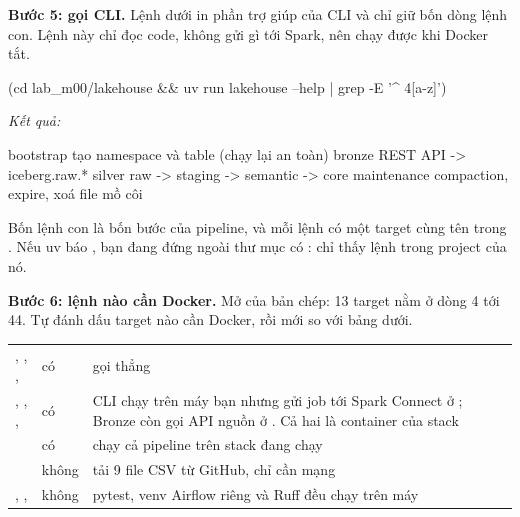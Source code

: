 \textbf{Bước 5: gọi CLI.} Lệnh dưới in phần trợ giúp của CLI  và chỉ giữ bốn dòng lệnh con. Lệnh này chỉ đọc code, không gửi gì tới Spark, nên chạy được khi Docker tắt.

\begin{codeblock}
(cd lab_m00/lakehouse && uv run lakehouse --help | grep -E '^ {4}[a-z]')
\end{codeblock}
\textit{Kết quả:}
\begin{codeblock}
    bootstrap           tạo namespace và table (chạy lại an toàn)
    bronze              REST API -> iceberg.raw.*
    silver              raw -> staging -> semantic -> core
    maintenance         compaction, expire, xoá file mồ côi
\end{codeblock}

Bốn lệnh con là bốn bước của pipeline, và mỗi lệnh có một target cùng tên trong . Nếu uv báo , bạn đang đứng ngoài thư mục có :  chỉ thấy lệnh  trong project của nó.

\textbf{Bước 6: lệnh nào cần Docker.} Mở  của bản chép: 13 target nằm ở dòng 4 tới 44. Tự đánh dấu target nào cần Docker, rồi mới so với bảng dưới.

\begin{xltabular}{\textwidth}{@{}P{3.6cm} P{1.6cm} L@{}}
\toprule
{} &  &  \\
\midrule
\endhead
\bottomrule
\endfoot
{}, , ,  & có & gọi thẳng  \\
, , ,  & có & CLI chạy trên máy bạn nhưng gửi job tới Spark Connect ở ; Bronze còn gọi API nguồn ở . Cả hai là container của stack \\
 & có & chạy cả pipeline trên stack đang chạy \\
 & không &  tải 9 file CSV từ GitHub, chỉ cần mạng \\
, ,  & không & pytest, venv Airflow riêng và Ruff đều chạy trên máy \\
\end{xltabular}

